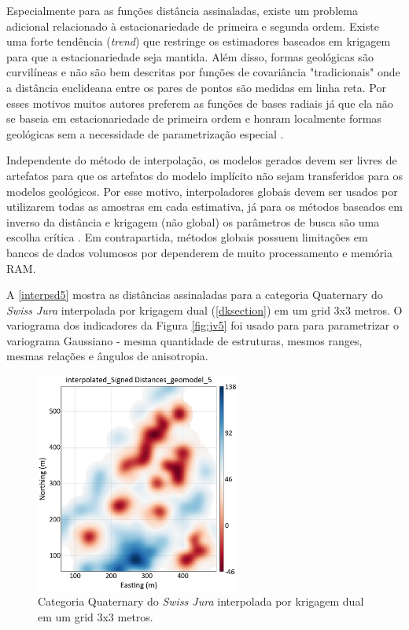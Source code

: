 Especialmente para as funções distância assinaladas, existe um problema adicional relacionado à estacionariedade de primeira e segunda ordem. Existe uma forte tendência (\textit{trend}) que restringe os estimadores baseados em krigagem para que a estacionariedade seja mantida. Além disso, formas geológicas são curvilíneas e não são bem descritas por funções de covariância "tradicionais" onde a distância euclideana entre os pares de pontos são medidas em linha reta. Por esses motivos muitos autores preferem as funções de bases radiais já que ela não se baseia em estacionariedade de primeira ordem e honram localmente formas geológicas sem a necessidade de parametrização especial \cite{martin2017implicitmodeling}.

Independente do método de interpolação, os modelos gerados devem ser livres de artefatos para que os artefatos do modelo implícito não sejam transferidos para os modelos geológicos. Por esse motivo, interpoladores globais devem ser usados por utilizarem todas as amostras em cada estimativa, já para os métodos baseados em inverso da distância e krigagem (não global) os parâmetros de busca são uma escolha crítica \cite{martin2017implicitmodeling}. Em contrapartida, métodos globais possuem limitações em bancos de dados volumosos por dependerem de muito processamento e memória RAM.

A \autoref{interpsd5} mostra as distâncias assinaladas para a categoria Quaternary do \textit{Swiss Jura} interpolada por krigagem dual (\autoref{dksection}) em um grid 3x3 metros. O variograma dos indicadores da Figura \autoref{fig:jv5} foi usado para para parametrizar o variograma Gaussiano - mesma quantidade de estruturas, mesmos ranges, mesmas relações e ângulos de anisotropia.

\begin{figure}[H]
	\centering
	\caption{\label{interpsd5}Categoria Quaternary do \textit{Swiss Jura} interpolada por krigagem dual em um grid 3x3 metros.}
	\includegraphics[width=0.6\textwidth]{capitulo_2/imagens/int_sd_5.png}
\end{figure}

